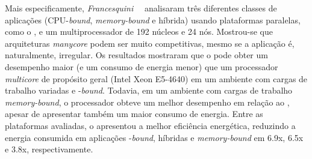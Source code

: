 Mais especificamente, \emph{Francesquini}~\etal~\cite{Castro-IA3-JPDC:2014} analisaram
três diferentes classes de aplicações (CPU-\textit{bound}, \textit{memory-bound}
e híbrida) usando plataformas paralelas, como o \mppa, e um multiprocessador \numa de
192 núcleos e 24 nós. Mostrou-se que arquiteturas \textit{manycore} podem ser muito
competitivas, mesmo se a aplicação é, naturalmente, irregular. Os resultados mostraram
que o \mppa pode obter um desempenho maior (e um consumo de energia menor) que um
processador \textit{multicore} de propósito geral (Intel Xeon E5-4640) em um ambiente
com cargas de trabalho variadas e \cpu{}-\textit{bound}. Todavia, em um ambiente com cargas
de trabalho \textit{memory-bound}, o processador \numa obteve um melhor desempenho
em relação ao \mppa, apesar de apresentar também um maior consumo de energia.
Entre as plataformas avaliadas, o \mppa apresentou a melhor eficiência
energética, reduzindo a energia consumida em aplicações \cpu{}-\textit{bound},
híbridas e \textit{memory-bound} em 6.9x, 6.5x e 3.8x, respectivamente.

